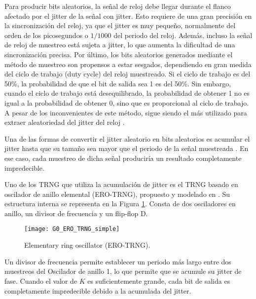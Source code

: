                 Para producir bits aleatorios, la señal de reloj debe llegar durante el flanco afectado por el jitter de la señal con jitter. Esto requiere de una gran precisión en la sincronización del reloj, ya que el jitter es muy pequeño, normalmente del orden de los picosegundos o $1/1000$ del periodo del reloj. Además, incluso la señal de reloj de muestreo está sujeta a jitter, lo que aumenta la dificultad de una sincronización precisa. Por último, los bits aleatorios generados mediante el método de muestreo son propensos a estar sesgados, dependiendo en gran medida del ciclo de trabajo (duty cycle) del reloj muestreado. Si el ciclo de trabajo es del 50\%, la probabilidad de que el bit de salida sea 1 es del 50\%. Sin embargo, cuando el ciclo de trabajo está desequilibrado, la probabilidad de obtener 1 no es igual a la probabilidad de obtener 0, sino que es proporcional al ciclo de trabajo. A pesar de los inconvenientes de este método, sigue siendo el más utilizado para extraer aleatoriedad del jitter del reloj \cite{Sunar2007,Baudet2010,Rozic2015,Cherkaoui2013, Zhang2018}.

                Una de las formas de convertir el jitter aleatorio en bits aleatorios es acumular el jitter hasta que su tamaño sea mayor que el periodo de la señal muestreada \cite{Baudet2010}. En ese caso, cada muestreo de dicha señal produciría un resultado completamente impredecible.

                Uno de los TRNG que utiliza la acumulación de jitter es el TRNG basado en oscilador de anillo elemental (ERO-TRNG), propuesto y modelado en \cite{Baudet2010}. Su estructura interna se representa en la Figura \ref{fig:G0_ERO_TRNG_simple}. Consta de dos osciladores en anillo, un divisor de frecuencia y un flip-flop D.

                \begin{figure}[hbtp]
                    \caption{Elementary ring oscillator (ERO-TRNG).}
                    \centering
                    \texttt{[image: G0\_ERO\_TRNG\_simple]}
                    \label{fig:G0_ERO_TRNG_simple}
                \end{figure}

                Un divisor de frecuencia permite establecer un periodo más largo entre dos muestreos del Oscilador de anillo 1, lo que permite que se acumule su jitter de fase. Cuando el valor de $K$ es suficientemente grande, cada bit de salida es completamente impredecible debido a la acumulada del jitter.

